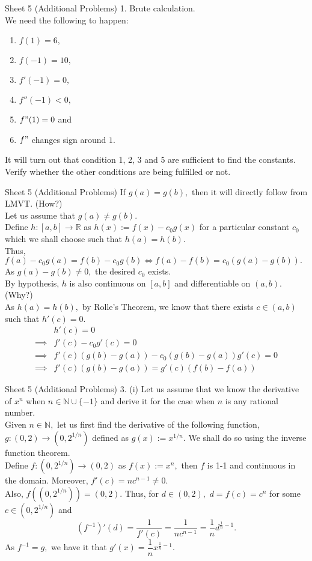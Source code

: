 \documentclass[handout, aspectratio=169]{beamer}
\begin{document}
\begin{frame}{Sheet 5 (Additional Problems)}
	1. Brute calculation.\\
	We need the following to happen:\\
	\begin{enumerate} 
		\item $f(1) = 6,$
		\item $f(-1) = 10,$
		\item $f'(-1) = 0,$
		\item $f''(-1) < 0,$
		\item $f"(1) = 0$ and
		\item $f"$ changes sign around $1.$
	\end{enumerate}
	It will turn out that condition 1, 2, 3 and 5 are sufficient to find the constants. Verify whether the other conditions are being fulfilled or not.
\end{frame}
\begin{frame}{Sheet 5 (Additional Problems)}
	If $g(a) = g(b),$ then it will directly follow from LMVT. (How?)\\
	Let us assume that $g(a) \neq g(b).$\\
	Define $h:[a, b] \to \mathbb{R}$ as $h(x) := f(x) - c_0g(x)$ for a particular constant $c_0$ which we shall choose such that $h(a) = h(b).$\\
	Thus, $f(a) - c_0g(a) = f(b) - c_0g(b) \iff f(a) - f(b) = c_0(g(a) - g(b)).$ As $g(a) - g(b) \neq 0,$ the desired $c_0$ exists.\\
	By hypothesis, $h$ is also continuous on $[a, b]$ and differentiable on $(a, b).$ (Why?)\\
	As $h(a) = h(b),$ by Rolle's Theorem, we know that there exists $c \in (a, b)$ such that $h'(c) = 0.$\\
	\begin{align*}
		&h'(c) = 0\\
		\implies& f'(c) - c_0g'(c) = 0\\
		\implies& f'(c)(g(b) - g(a)) - c_0(g(b) - g(a))g'(c) = 0\\
		\implies& f'(c)(g(b) - g(a)) = g'(c)(f(b) - f(a))
	\end{align*}
\end{frame}
\begin{frame}{Sheet 5 (Additional Problems)}
	3. (i) Let us assume that we know the derivative of $x^n$ when $n \in \mathbb{N} \cup \{-1\}$ and derive it for the case when $n$ is any rational number. \\
	Given $n \in \mathbb{N},$ let us first find the derivative of the following function, $g:(0, 2) \to (0, 2^{1/n})$ defined as $g(x) := x^{1/n}.$ We shall do so using the inverse function theorem.\\
	Define $f:(0, 2^{1/n}) \to (0, 2)$ as $f(x) := x^n,$ then $f$ is 1-1 and continuous in the domain. Moreover, $f'(c) = nc^{n-1} \neq 0.$\\
	Also, $f\left((0,2^{1/n})\right) = (0, 2).$	Thus, for $d \in (0, 2),$ $d = f(c) = c^n$ for some $c \in (0, 2^{1/n})$ and
	\[(f^{-1})'(d) = \dfrac{1}{f'(c)} = \dfrac{1}{nc^{n-1}} = \dfrac{1}{n}d^{\frac{1}{n} - 1}.\]
	As $f^{-1} = g,$ we have it that $g'(x) = \dfrac{1}{n}x^{\frac{1}{n} - 1}.$
\end{frame}
\end{document}
